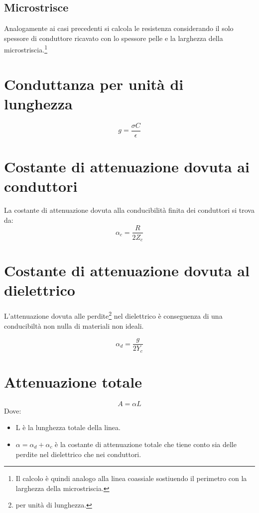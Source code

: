 \documentclass[10pt,a4paper]{report}
\begin{document}
		\subsection{Microstrisce}

			Analogamente ai casi precedenti si calcola le resistenza considerando il solo spessore di conduttore ricavato con lo spessore pelle e la larghezza della microstriscia.\footnote{Il calcolo è quindi analogo alla linea coassiale sostiuendo il perimetro con la larghezza della microstriscia.}

	\section{Conduttanza per unità di lunghezza}

			\begin{equation}
			g=\frac{\sigma C}{\epsilon}
			\end{equation}





	\section{Costante di attenuazione dovuta ai conduttori}
	
			La costante di attenuazione dovuta alla conducibilità finita dei conduttori si trova da:
			\begin{equation}
			\alpha_c=\frac{R}{2Z_c}
			\end{equation}
		
	\section{Costante di attenuazione dovuta al dielettrico}
	
			L'attenuazione dovuta alle perdite\footnote{per unità di lunghezza.} nel dielettrico è conseguenza di una conducibiltà non nulla di materiali non ideali.

			\begin{equation}
			\alpha_d=\frac{g}{2Y_c}
			\end{equation}

	\section{Attenuazione totale}

			\begin{equation}
			A=\alpha L
			\end{equation}
			Dove:
			\begin{itemize}
			\item L è la lunghezza totale della linea.
			\item $\alpha=\alpha_d+\alpha_c$ è la costante di attenuazione totale che tiene conto sia delle perdite nel dielettrico che nei conduttori.
			\end{itemize}
\end{document}
